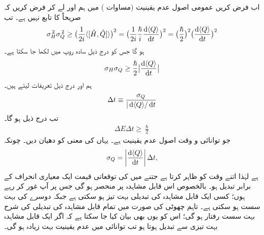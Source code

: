 اب فرض کریں عمومی اصول عدم یقینیت (مساوات ) میں ہم  اور  لے کر فرض کریں کہ  صریحاً  کا تابع نہیں ہے۔ تب
\begin{align*}
\sigma_{H}^{\,2} \sigma_{Q}^{\,2} \geq \big( \frac{1}{2i} \langle [ \hat{H}, \hat{Q} ] \rangle \big)^{2} = \big( \frac{1}{2i} \frac{\hslash}{i} \frac{\dif \, \langle Q \rangle}{\dif t} \big)^{2} = \big( \frac{\hslash}{2} \big)^{2} \big( \frac{\dif\, \langle Q \rangle}{\dif t} \big)^{2} 
\end{align*}
ہو گا جس کو درج ذیل سادہ روپ میں لکھا جا سکتا ہے۔ 
\begin{align}
\sigma_{H} \sigma_{Q} \geq \frac{\hslash}{2} \big | \frac{\dif \,\langle Q \rangle}{\dif t} \big| 
\end{align}
ہم  اور درج ذیل تعریفات لیتے ہیں۔
\begin{align}
\Delta t \equiv \frac{\sigma_{Q}}{|\dif\, \langle Q \rangle / \dif t} 
\end{align}
تب درج ذیل ہو گا۔
\begin{align}\label{مساوات_قواعد_توانائی_و_وقت_اصول_عدم_یقینیت}
\Delta E \Delta t \geq \frac{\hslash}{2}
\end{align}
جو توانائی و وقت اصول عدم یقینیت ہے۔ یہاں  کی معنی کو دھیان دیں۔ چونکہ 
\begin{align*}
\sigma_{Q} = \left| \frac{\dif\, \langle Q \rangle}{\dif t} \right| \Delta t ,
\end{align*}
ہے لہٰذا  اتنے وقت کو ظاہر کرتا ہے جتنے میں  کی توقعاتی قیمت ایک معیاری انحراف کے برابر تبدیل ہو۔ بالخصوص  اس قابل مشاہدہ  پر منحصر ہو گی جس پر آپ غور کر رہے ہوں؛ کسی ایک قابل مشاہدہ کی تبدیلی بہت تیز ہو سکتی ہے جبکہ دوسرے کی بہت سست ہو سکتی ہے۔ تاہم چھوٹی  کی صورت میں تمام قابل مشاہدہ کی تبدیلی کی شرح بہت سست رفتار ہو گی؛ اس کو یوں بھی بیان کیا جا سکتا ہے کہ اگر ایک قابل مشاہدہ بہت تیزی سے تبدیل ہوتا ہو تب توانائی میں عدم یقینیت بہت زیادہ ہو گی۔

